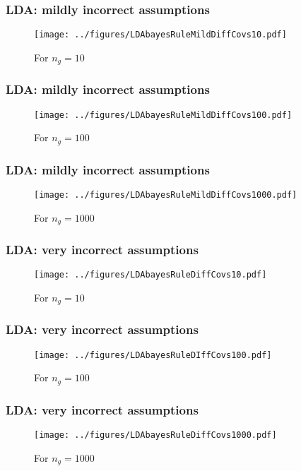 \documentclass[12pt]{beamer}
\begin{document}
\begin{frame}[fragile]
\frametitle{LDA: mildly incorrect assumptions}
\begin{figure}
\centering
\texttt{[image: ../figures/LDAbayesRuleMildDiffCovs10.pdf]}
\caption{For $n_g = 10$}
\end{figure}
\end{frame}


\begin{frame}[fragile]
\frametitle{LDA: mildly incorrect assumptions}
\begin{figure}
\centering
\texttt{[image: ../figures/LDAbayesRuleMildDiffCovs100.pdf]}
\caption{For $n_g = 100$}
\end{figure}
\end{frame}

\begin{frame}[fragile]
\frametitle{LDA: mildly incorrect assumptions}
\begin{figure}
\centering
\texttt{[image: ../figures/LDAbayesRuleMildDiffCovs1000.pdf]}
\caption{For $n_g = 1000$}
\end{figure}
\end{frame}


\begin{frame}[fragile]
\frametitle{LDA: very incorrect assumptions}
\begin{figure}
\centering
\texttt{[image: ../figures/LDAbayesRuleDiffCovs10.pdf]}
\caption{For $n_g = 10$}
\end{figure}
\end{frame}


\begin{frame}[fragile]
\frametitle{LDA: very incorrect assumptions}
\begin{figure}
\centering
\texttt{[image: ../figures/LDAbayesRuleDIffCovs100.pdf]}
\caption{For $n_g = 100$}
\end{figure}
\end{frame}

\begin{frame}[fragile]
\frametitle{LDA: very incorrect assumptions}
\begin{figure}
\centering
\texttt{[image: ../figures/LDAbayesRuleDiffCovs1000.pdf]}
\caption{For $n_g = 1000$}
\end{figure}
\end{frame}
\end{document}
